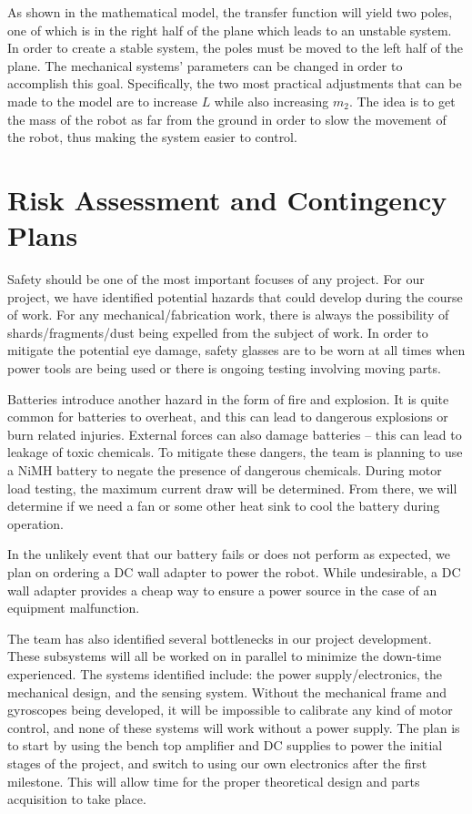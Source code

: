 \documentclass[11pt]{report}
\begin{document}
\begin{spacing}{1.5}
As shown in the mathematical model, the transfer function will yield two poles, one of which is in the right half of the plane which leads to an unstable system.  In order to create a stable system, the poles must be moved to the left half of the plane.  The mechanical systems’ parameters can be changed in order to accomplish this goal.  Specifically, the two most practical adjustments that can be made to the model are to increase $L$ while also increasing $m_2$.  The idea is to get the mass of the robot as far from the ground in order to slow the movement of the robot, thus making the system easier to control.

\section*{Risk Assessment and Contingency Plans} %

Safety should be one of the most important focuses of any project. For our project, we have identified potential hazards that could develop during the course of work. For any mechanical/fabrication work, there is always the possibility of shards/fragments/dust being expelled from the subject of work. In order to mitigate the potential eye damage, safety glasses are to be worn at all times when power tools are being used or there is ongoing testing involving moving parts. 

Batteries introduce another hazard in the form of fire and explosion. It is quite common for batteries to overheat, and this can lead to dangerous explosions or burn related injuries. External forces can also damage batteries – this can lead to leakage of toxic chemicals. To mitigate these dangers, the team is planning to use a NiMH battery to negate the presence of dangerous chemicals. During motor load testing, the maximum current draw will be determined. From there, we will determine if we need a fan or some other heat sink to cool the battery during operation. 

In the unlikely event that our battery fails or does not perform as expected, we plan on ordering a DC wall adapter to power the robot. While undesirable, a DC wall adapter provides a cheap way to ensure a power source in the case of an equipment malfunction. 

The team has also identified several bottlenecks in our project development. These subsystems will all be worked on in parallel to minimize the down-time experienced. The systems identified include: the power supply/electronics, the mechanical design, and the sensing system. Without the mechanical frame and gyroscopes being developed, it will be impossible to calibrate any kind of motor control, and none of these systems will work without a power supply. The plan is to start by using the bench top amplifier and DC supplies to power the initial stages of the project, and switch to using our own electronics after the first milestone. This will allow time for the proper theoretical design and parts acquisition to take place.  



\end{spacing}
\end{document}
